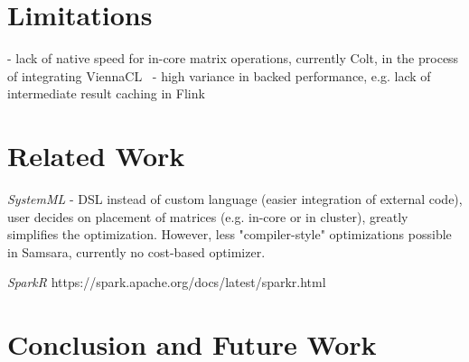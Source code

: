 \documentclass{article}
\begin{document}
\section{Limitations}

 - lack of native speed for in-core matrix operations, currently Colt, in the process of integrating ViennaCL~\cite{Tillet2013}
 - high variance in backed performance, e.g. lack of intermediate result caching in Flink

\section{Related Work}

{\em SystemML} \cite{Ghoting2011} - DSL instead of custom language (easier integration of external code), user decides on placement of matrices (e.g. in-core or in cluster), greatly simplifies the optimization. However, less "compiler-style" optimizations possible in Samsara, currently no cost-based optimizer.

{\em SparkR} https://spark.apache.org/docs/latest/sparkr.html

\section{Conclusion and Future Work}





\end{document}
